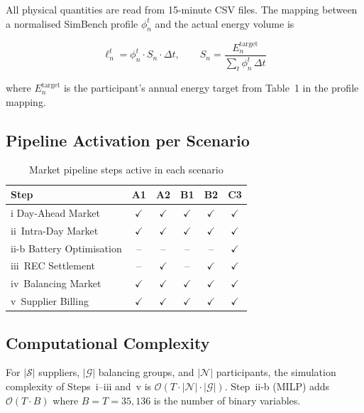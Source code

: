 \documentclass[12pt,a4paper]{article}
\begin{document}
All physical quantities are read from 15-minute CSV files.  The mapping
between a normalised SimBench profile $\phi_{n}^{t}$ and the actual energy
volume is

\begin{equation}
\ell_{n}^{t} = \phi_{n}^{t} \cdot S_{n} \cdot \Delta t, \qquad
S_{n} = \frac{E_{n}^{\mathrm{target}}}{\sum_{t}\phi_{n}^{t}\,\Delta t}
\label{eq:profile_scaling}
\end{equation}

where $E_{n}^{\mathrm{target}}$ is the participant's annual energy target from
Table~1 in the profile mapping.

\subsection{Pipeline Activation per Scenario}

\begin{table}[H]
\centering
\caption{Market pipeline steps active in each scenario}
\label{tab:step_scope}
\begin{tabular}{@{}lccccc@{}}
\toprule
Step & A1 & A2 & B1 & B2 & C3\\
\midrule
i\;\; Day-Ahead Market        & $\checkmark$ & $\checkmark$ & $\checkmark$ & $\checkmark$ & $\checkmark$\\
ii\;\ Intra-Day Market        & $\checkmark$ & $\checkmark$ & $\checkmark$ & $\checkmark$ & $\checkmark$\\
ii-b Battery Optimisation     & --           & --           & --           & --           & $\checkmark$\\
iii\ REC Settlement           & --           & $\checkmark$ & --           & $\checkmark$ & $\checkmark$\\
iv\;\ Balancing Market        & $\checkmark$ & $\checkmark$ & $\checkmark$ & $\checkmark$ & $\checkmark$\\
v\;\;\ Supplier Billing       & $\checkmark$ & $\checkmark$ & $\checkmark$ & $\checkmark$ & $\checkmark$\\
\bottomrule
\end{tabular}
\end{table}

\subsection{Computational Complexity}

For $|\mathcal{S}|$ suppliers, $|\mathcal{G}|$ balancing groups, and
$|\mathcal{N}|$ participants, the simulation complexity of Steps~i--iii and~v
is $\mathcal{O}(T \cdot |\mathcal{N}| \cdot |\mathcal{G}|)$.  Step~ii-b
(MILP) adds $\mathcal{O}(T \cdot B)$ where $B = T = 35{,}136$ is the number
of binary variables.



\end{document}
